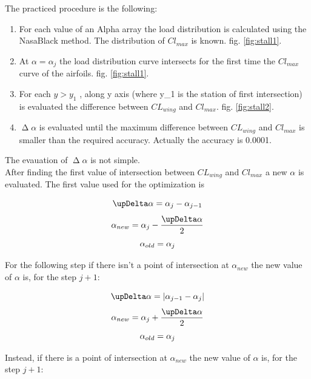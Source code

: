 The  practiced procedure is the following:

\begin{enumerate}
\item For each value of an Alpha array the load distribution is calculated using the NasaBlack method.  The distribution of  $Cl_{max}$ is known. fig. \ref{fig:stall1}.
\item At $\alpha = \alpha_j$ the load distribution curve intersects for the first time the $Cl_{max}$ curve of the airfoils. fig. \ref{fig:stall1}.
\item For each $ y > y_1 $ , along y axis (where y_1 is the station of first intersection) is evaluated the difference between $CL_{wing}$ and $Cl_{max}$. fig. \ref{fig:stall2}.
\item $\upDelta \alpha$ is evaluated until the maximum difference between $CL_{wing}$ and $Cl_{max}$ is smaller than the required accuracy. Actually the accuracy is 0.0001. 
\end{enumerate}

The evauation of $\upDelta \alpha$ is not simple.\\
After finding the first value of intersection between $CL_{wing}$ and $Cl_{max}$ a new $\alpha$ is evaluated. The first value used for the optimization is 

\begin{equation}\notag
\upDelta \alpha = \alpha_j -\alpha_{j-1}
\end{equation}
\begin{equation}\notag
\alpha_{new} = \alpha_j - \frac {\upDelta \alpha }{2}
\end{equation}
\begin{equation}\notag
\alpha_{old}= \alpha_j
\end{equation}

For the following step if there isn't a point of intersection at $\alpha_{new}$ the new value of $\alpha$ is, for the step $j+1$:


\begin{equation}\notag
\upDelta \alpha = |\alpha_{j-1} -\alpha_{j}|
\end{equation}
\begin{equation}\notag
\alpha_{new} = \alpha_{j} + \frac {\upDelta \alpha }{2}
\end{equation}
\begin{equation}\notag
\alpha_{old}= \alpha_j
\end{equation}

Instead,  if there is a point of intersection at $\alpha_{new}$ the new value of $\alpha$ is, for the step $j+1$:


